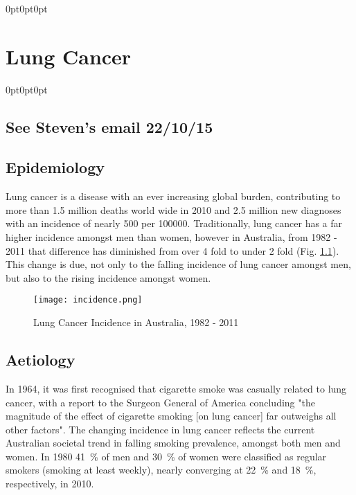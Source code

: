\titlespacing{\chapter} {0pt}{0pt}{0pt}
\chapter{Lung Cancer} 
\ifpdf
    \graphicspath{{Chapter1/figures/}}
\else
    \graphicspath{{Chapter1/figures/}}
\fi

\titlespacing{\section} {0pt}{0pt}{0pt}
\section{See Steven's email 22/10/15}

\section{Epidemiology}
Lung cancer is a disease with an ever increasing global burden, contributing to more than 1.5 million deaths world wide in 2010\supercite{Lozano:2012kd} and 2.5 million new diagnoses\supercite{Jemal:2008df} with an incidence of nearly 500 per 100000\supercite{Boyle:2008va}. Traditionally, lung cancer has a far higher incidence amongst men than women, however in Australia, from 1982 - 2011 that difference has diminished from over 4 fold to under 2 fold (Fig. \ref{figIncidence})\supercite{AIHW:2015tp}. This change is due, not only to the falling incidence of lung cancer amongst men, but also to the rising incidence amongst women. 
\begin{figure}[h] %
	\centering
	\texttt{[image: incidence.png]}
	\caption{Lung Cancer Incidence in Australia, 1982 - 2011}
	\label{figIncidence}
\end{figure}


\section{Aetiology}
In 1964, it was first recognised that cigarette smoke was casually related to lung cancer, with a report to the Surgeon General of America concluding "the magnitude of the effect of cigarette smoking [on lung cancer] far outweighs all other factors"\supercite{Service:1976tz}. The changing incidence in lung cancer reflects the current Australian societal trend in falling smoking prevalence, amongst both men and women. In 1980 41~\% of men and 30~\% of women were classified as regular smokers (smoking at least weekly), nearly converging at 22~\% and 18~\%, respectively, in 2010\supercite{Scollo:2013vj}. 

